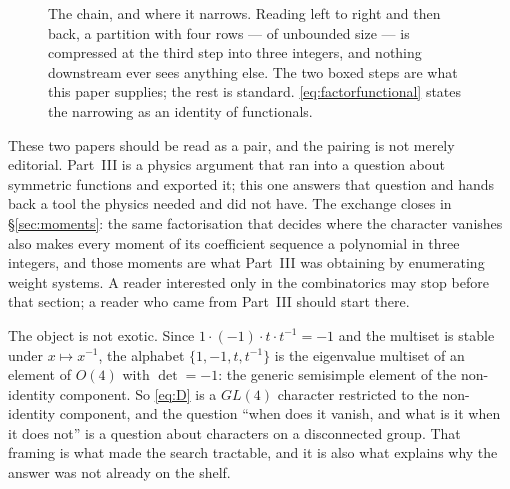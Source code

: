 \documentclass[11pt,a4paper]{article}
\begin{document}
\begin{figure}[h]
\centering
{}
\caption{The chain, and where it narrows. Reading left to right and then back, a partition with
four rows --- of unbounded size --- is compressed at the third step into three integers, and
nothing downstream ever sees anything else. The two boxed steps are what this paper supplies;
the rest is standard. \eqref{eq:factorfunctional} states the narrowing as an identity of
functionals.}
\label{fig:chain}
\end{figure}

These two papers should be read as a pair, and the pairing is not merely editorial. Part~III is
a physics argument that ran into a question about symmetric functions and exported it; this one
answers that question and hands back a tool the physics needed and did not have. The exchange
closes in \S\ref{sec:moments}: the same factorisation that decides where the character vanishes
also makes every moment of its coefficient sequence a polynomial in three integers, and those
moments are what Part~III was obtaining by enumerating weight systems. A reader interested only
in the combinatorics may stop before that section; a reader who came from Part~III should start
there.

The object is not exotic. Since $1\cdot(-1)\cdot t\cdot t^{-1}=-1$ and the multiset is stable
under $x\mapsto x^{-1}$, the alphabet $\{1,-1,t,t^{-1}\}$ is the eigenvalue multiset of an
element of $O(4)$ with $\det=-1$: the generic semisimple element of the non-identity
component. So \eqref{eq:D} is a $GL(4)$ character restricted to the non-identity component, and the
question ``when does it vanish, and what is it when it does not'' is a question about
characters on a disconnected group. That framing is what made the search tractable, and it is
also what explains why the answer was not already on the shelf.
\end{document}
